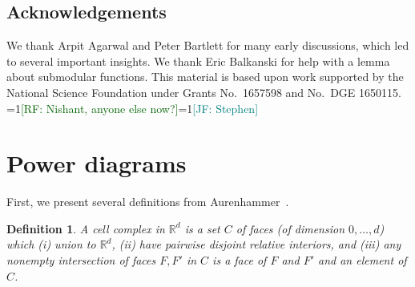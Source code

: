 \documentclass[11pt]{article}
\newcommand{\Comments}{1}
\newcommand{\mynote}[2]{\ifnum\Comments=1\textcolor{#1}{#2}\fi}
\newcommand{\raf}[1]{\mynote{darkgreen}{[RF: #1]}}
\newcommand{\jessie}[1]{\mynote{teal}{[JF: #1]}}
\newcommand{\reals}{\mathbb{R}}
\newtheorem{conjecture}{Conjecture}
\newtheorem{definition}{Definition}
\begin{document}




\subsection*{Acknowledgements}
We thank Arpit Agarwal and Peter Bartlett for many early discussions, which led to several important insights.
We thank Eric Balkanski for help with a lemma about submodular functions. %
This material is based upon work supported by the National Science Foundation under Grants No.\ 1657598 and No.\ DGE 1650115.
\raf{Nishant, anyone else now?}\jessie{Stephen}
\newpage



\appendix

\newpage
\section{Power diagrams}\label{app:power-diagrams}
First, we present several definitions from Aurenhammer~\cite{aurenhammer1987power}.
\begin{definition}\label{def:cell-complex}
  A \emph{cell complex} in $\reals^d$ is a set $C$ of faces (of dimension $0,\ldots,d$) which (i) union to $\reals^d$, (ii) have pairwise disjoint relative interiors, and (iii) any nonempty intersection of faces $F,F'$ in $C$ is a face of $F$ and $F'$ and an element of $C$.
\end{definition}
\end{document}
